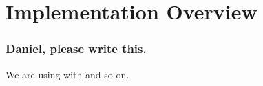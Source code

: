 \section{Implementation Overview}


\begin{frame}
\frametitle{Daniel, please write this.}
We are using  with  and so on.
\end{frame}
